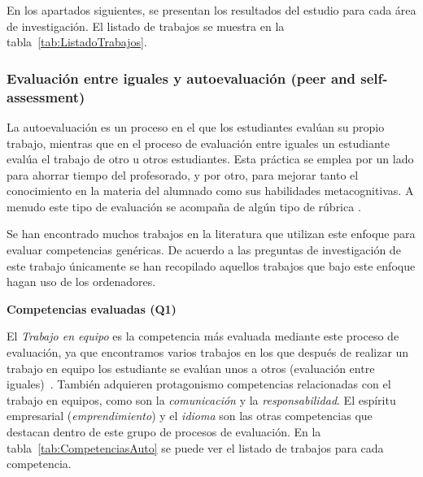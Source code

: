 En los apartados siguientes, se presentan los resultados del estudio para cada área de investigación. El listado de trabajos se muestra en la tabla~\ref{tab:ListadoTrabajos}.

\subsubsection{Evaluación entre iguales y autoevaluación (peer and self-assessment)}

La autoevaluación es un proceso en el que los estudiantes evalúan su propio trabajo, mientras que  en el proceso de evaluación entre iguales un estudiante evalúa el trabajo de otro u otros estudiantes. Esta práctica se emplea por un lado para ahorrar tiempo del profesorado, y por otro, para mejorar tanto el conocimiento en la materia del alumnado como sus habilidades metacognitivas. A menudo este tipo de evaluación se acompaña de algún tipo de rúbrica \cite{malehorn1994ten}.

Se han encontrado muchos trabajos en la literatura que utilizan este enfoque para evaluar competencias genéricas. De acuerdo a las preguntas de investigación de este trabajo únicamente se han recopilado aquellos trabajos que bajo este enfoque hagan uso de los ordenadores.

\bigskip
\textbf{Competencias evaluadas (Q1)}
\bigskip

El \emph{Trabajo en equipo} es la competencia más evaluada mediante este proceso de evaluación, ya que encontramos varios trabajos en los que después de realizar un trabajo en equipo los estudiante se evalúan unos a otros (evaluación entre iguales)~\cite{ficapal2015learning,barbera2011assessment,khamis2012measurement}. También adquieren protagonismo competencias relacionadas con el trabajo en equipos, como son la \emph{comunicación} y la \emph{responsabilidad}. El espíritu empresarial (\emph{emprendimiento}) y el \emph{idioma} son las otras competencias que destacan dentro de este grupo de procesos de evaluación. En la tabla~\ref{tab:CompetenciasAuto} se puede ver el listado de trabajos para cada competencia.


